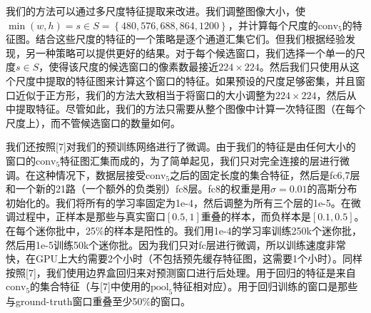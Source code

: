 \documentclass[../main.tex]{subfile}
\begin{document}
我们的方法可以通过多尺度特征提取来改进。我们调整图像大小，使$\min\left(w, h\right) = s\in S = \left\{ 480, 576, 688, 864, 1200 \right\}$，并计算每个尺度的$\text{conv}_5$的特征图。结合这些尺度的特征的一个策略是逐个通道汇集它们。但我们根据经验发现，另一种策略可以提供更好的结果。对于每个候选窗口，我们选择一个单一的尺度$s\in S$，使得该尺度的候选窗口的像素数最接近$224\times 224$。然后我们只使用从这个尺度中提取的特征图来计算这个窗口的特征。如果预设的尺度足够密集，并且窗口近似于正方形，我们的方法大致相当于将窗口的大小调整为$224\times 224$，然后从中提取特征。尽管如此，我们的方法只需要从整个图像中计算一次特征图（在每个尺度上），而不管候选窗口的数量如何。

我们还按照[7]对我们的预训练网络进行了微调。由于我们的特征是由任何大小的窗口的$\text{conv}_5$特征图汇集而成的，为了简单起见，我们只对完全连接的层进行微调。在这种情况下，数据层接受$\text{conv}_5$之后的固定长度的集合特征，然后是fc6,7层和一个新的21路（一个额外的负类别）fc8层。fc8的权重是用$σ=0.01$的高斯分布初始化的。我们将所有的学习率固定为1e-4，然后调整为所有三个层的1e-5。在微调过程中，正样本是那些与真实窗口$\left[ 0.5, 1 \right]$重叠的样本，而负样本是$\left[ 0.1, 0.5 \right]$。在每个迷你批中，25\%的样本是阳性的。我们用1e-4的学习率训练250k个迷你批，然后用1e-5训练50k个迷你批。因为我们只对fc层进行微调，所以训练速度非常快，在GPU上大约需要2个小时（不包括预先缓存特征图，这需要1个小时）。同样按照[7]，我们使用边界盒回归来对预测窗口进行后处理。用于回归的特征是来自$\text{conv}_5$的集合特征（与[7]中使用的$\text{pool}_5$特征相对应）。用于回归训练的窗口是那些与ground-truth窗口重叠至少50\%的窗口。
\end{document}

